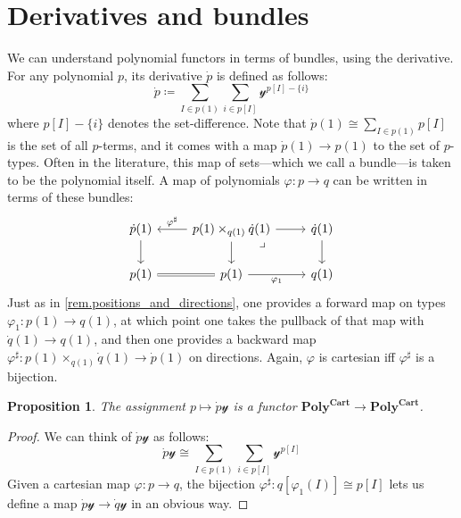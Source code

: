 \documentclass[11pt, one side, article]{memoir}
\theoremstyle{definition}
\theoremstyle{plain}
\newtheorem{proposition}[definitionx]{Proposition}
\newcommand{\Cat}[1]{\mathbf{#1}}%
\newcommand{\yon}{\mathcal{y}}
\newcommand{\poly}{\Cat{Poly}}
\newcommand{\polycart}{\poly^{\Cat{Cart}}}
\newcommand{\0}{\textsf{0}}
\newcommand{\1}{\tn{\textsf{1}}}
\begin{document}
\section{Derivatives and bundles}

We can understand polynomial functors in terms of bundles, using the derivative. For any polynomial $p$, its derivative $\dot{p}$ is defined as follows:
\begin{equation}\label{eqn.dotp}
\dot{p}\coloneqq\sum_{I\in p(1)}\sum_{i\in p[I]}\yon^{p[I]-\{i\}}
\end{equation}
where $p[I]-\{i\}$ denotes the set-difference. Note that $\dot{p}(1)\cong\sum_{I\in p(1)}p[I]$ is the set of all $p$-terms, and it comes with a map $\dot{p}(1)\to p(1)$ to the set of $p$-types. Often in the literature, this map of sets---which we call a bundle---is taken to be the polynomial itself. A map of polynomials $\varphi\colon p\to q$ can be written in terms of these bundles:
\[
\begin{tikzcd}
	\dot{p}(1)\ar[d]&p(1)\times_{q(1)}\dot{q}(1)\ar[l, "\varphi^\sharp"']\ar[r]\ar[d]&\dot{q}(1)\ar[d]\\
	p(1)\ar[r, equal]&p(1)\ar[r, "\varphi_1"']&q(1)\ar[ul, phantom, very near end, "\lrcorner"]
\end{tikzcd}
\]
Just as in \cref{rem.positions_and_directions}, one provides a forward map on types $\varphi_1\colon p(1)\to q(1)$, at which point one takes the pullback of that map with $\dot{q}(1)\to q(1)$, and then one provides a backward map $\varphi^\sharp\colon p(1)\times_{q(1)}\dot{q}(1)\to \dot{p}(1)$ on directions.
Again, $\varphi$ is cartesian iff $\varphi^\sharp$ is a bijection.

\begin{proposition}\label{prop.dotpy}
The assignment $p\mapsto\dot{p}\yon$ is a functor $\polycart\to\polycart$.
\end{proposition}
\begin{proof}
We can think of $\dot{p}\yon$ as follows:
\begin{equation}\label{eqn.derivy}
\dot{p}\yon\cong\sum_{I\in p(1)}\sum_{i\in p[I]}\yon^{p[I]}
\end{equation}
Given a cartesian map $\varphi\colon p\to q$, the bijection $\varphi^\sharp\colon q[\varphi_1(I)]\cong p[I]$ lets us define a map $\dot{p}\yon\to\dot{q}\yon$ in an obvious way. 
\end{proof}
\end{document}

